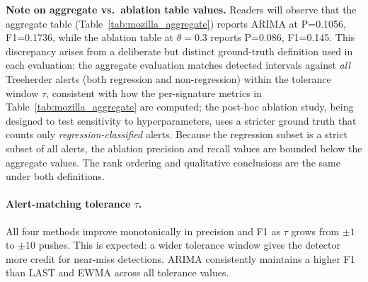 \documentclass[pdflatex,sn-nature]{sn-jnl}%
\theoremstyle{thmstyleone}%
\theoremstyle{thmstyletwo}%
\theoremstyle{thmstylethree}%
\begin{document}
\textbf{Note on aggregate vs.~ablation table values.} Readers will observe that the aggregate table (Table~\ref{tab:mozilla_aggregate}) reports ARIMA at P=0.1056, F1=0.1736, while the ablation table at $\theta{=}0.3$ reports P=0.086, F1=0.145. This discrepancy arises from a deliberate but distinct ground-truth definition used in each evaluation: the aggregate evaluation matches detected intervals against \emph{all} Treeherder alerts (both regression and non-regression) within the tolerance window $\tau$, consistent with how the per-signature metrics in Table~\ref{tab:mozilla_aggregate} are computed; the post-hoc ablation study, being designed to test sensitivity to hyperparameters, uses a stricter ground truth that counts only \emph{regression-classified} alerts. Because the regression subset is a strict subset of all alerts, the ablation precision and recall values are bounded below the aggregate values. The rank ordering and qualitative conclusions are the same under both definitions.

\begin{table}[tbp]
\centering
{}
\caption{Ablation on detection threshold $\theta$ (P = mean precision, F1 = mean F1 score; $\tau{=}5$, $\beta{=}0.3$).}
\label{tab:ablation_threshold}
\end{table}

\paragraph{Alert-matching tolerance $\tau$.}
All four methods improve monotonically in precision and F1 as $\tau$ grows from $\pm1$ to $\pm10$ pushes. This is expected: a wider tolerance window gives the detector more credit for near-miss detections. ARIMA consistently maintains a higher F1 than LAST and EWMA across all tolerance values.
\end{document}
